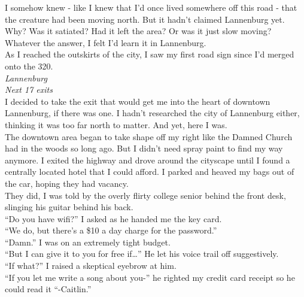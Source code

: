 \documentclass[a5paper]{scrartcl}
\begin{document}
I somehow knew - like I knew that I'd once lived somewhere off this road - that the creature had been moving north. But it hadn't claimed Lannenburg yet. Why? Was it satiated? Had it left the area? Or was it just slow moving? Whatever the answer, I felt I'd learn it in Lannenburg.\\


As I reached the outskirts of the city, I saw my first road sign since I'd merged onto the 320.\\


\textit{Lannenburg}
\\


\textit{Next 17 exits}
\\


I decided to take the exit that would get me into the heart of downtown Lannenburg, if there was one. I hadn't researched the city of Lannenburg either, thinking it was too far north to matter. And yet, here I was.\\


The downtown area began to take shape off my right like the Damned Church had in the woods so long ago. But I didn't need spray paint to find my way anymore. I exited the highway and drove around the cityscape until I found a centrally located hotel that I could afford. I parked and heaved my bags out of the car, hoping they had vacancy.\\


They did, I was told by the overly flirty college senior behind the front desk, slinging his guitar behind his back.\\


\enquote{Do you have wifi?} I asked as he handed me the key card.\\


\enquote{We do, but there's a \$10 a day charge for the password.}\\


\enquote{Damn.} I was on an extremely tight budget.\\


\enquote{But I can give it to you for free if\dots } He let his voice trail off suggestively.\\


\enquote{If what?} I raised a skeptical eyebrow at him.\\


\enquote{If you let me write a song about you-}  he righted my credit card receipt so he could read it \enquote{-Caitlin.}\\
\end{document}

